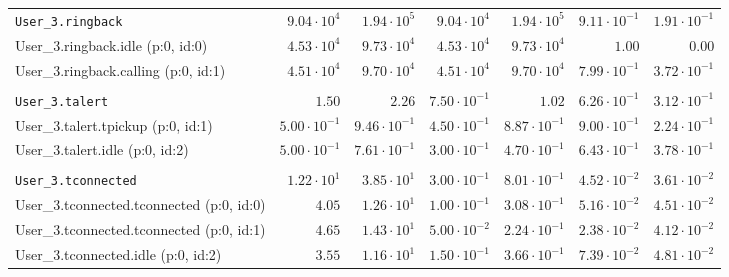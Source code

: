 \begin{table}[htbp]
{\begin{tabular}{lrrrrrr}
\\[-8pt]\texttt{User\_3.ringback}                     &  $9.04 \cdot 10^{4}$ &  $1.94 \cdot 10^{5}$ &  $9.04 \cdot 10^{4}$ &  $1.94 \cdot 10^{5}$ & $9.11 \cdot 10^{-1}$ & $1.91 \cdot 10^{-1}$ \\
\hspace{3mm}User\_3.ringback.idle (p:0, id:0)         &  $4.53 \cdot 10^{4}$ &  $9.73 \cdot 10^{4}$ &  $4.53 \cdot 10^{4}$ &  $9.73 \cdot 10^{4}$ &               $1.00$ &               $0.00$ \\
\hspace{3mm}User\_3.ringback.calling (p:0, id:1)      &  $4.51 \cdot 10^{4}$ &  $9.70 \cdot 10^{4}$ &  $4.51 \cdot 10^{4}$ &  $9.70 \cdot 10^{4}$ & $7.99 \cdot 10^{-1}$ & $3.72 \cdot 10^{-1}$ \\
\\[-8pt]\texttt{User\_3.talert}                       &               $1.50$ &               $2.26$ & $7.50 \cdot 10^{-1}$ &               $1.02$ & $6.26 \cdot 10^{-1}$ & $3.12 \cdot 10^{-1}$ \\
\hspace{3mm}User\_3.talert.tpickup (p:0, id:1)        & $5.00 \cdot 10^{-1}$ & $9.46 \cdot 10^{-1}$ & $4.50 \cdot 10^{-1}$ & $8.87 \cdot 10^{-1}$ & $9.00 \cdot 10^{-1}$ & $2.24 \cdot 10^{-1}$ \\
\hspace{3mm}User\_3.talert.idle (p:0, id:2)           & $5.00 \cdot 10^{-1}$ & $7.61 \cdot 10^{-1}$ & $3.00 \cdot 10^{-1}$ & $4.70 \cdot 10^{-1}$ & $6.43 \cdot 10^{-1}$ & $3.78 \cdot 10^{-1}$ \\
\\[-8pt]\texttt{User\_3.tconnected}                   &  $1.22 \cdot 10^{1}$ &  $3.85 \cdot 10^{1}$ & $3.00 \cdot 10^{-1}$ & $8.01 \cdot 10^{-1}$ & $4.52 \cdot 10^{-2}$ & $3.61 \cdot 10^{-2}$ \\
\hspace{3mm}User\_3.tconnected.tconnected (p:0, id:0) &               $4.05$ &  $1.26 \cdot 10^{1}$ & $1.00 \cdot 10^{-1}$ & $3.08 \cdot 10^{-1}$ & $5.16 \cdot 10^{-2}$ & $4.51 \cdot 10^{-2}$ \\
\hspace{3mm}User\_3.tconnected.tconnected (p:0, id:1) &               $4.65$ &  $1.43 \cdot 10^{1}$ & $5.00 \cdot 10^{-2}$ & $2.24 \cdot 10^{-1}$ & $2.38 \cdot 10^{-2}$ & $4.12 \cdot 10^{-2}$ \\
\hspace{3mm}User\_3.tconnected.idle (p:0, id:2)       &               $3.55$ &  $1.16 \cdot 10^{1}$ & $1.50 \cdot 10^{-1}$ & $3.66 \cdot 10^{-1}$ & $7.39 \cdot 10^{-2}$ & $4.81 \cdot 10^{-2}$ \\

\end{tabular}}
\end{table}
